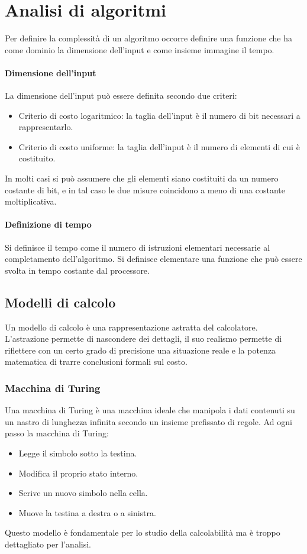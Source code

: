 \chapter{Analisi di algoritmi}
Per definire la complessit\`a di un algoritmo occorre definire una funzione che ha come dominio la dimensione dell'input e come insieme immagine il tempo.
\subsubsection{Dimensione dell'input}
La dimensione dell'input pu\`o essere definita secondo due criteri:
\begin{itemize}
\item Criterio di costo logaritmico: la taglia dell'input \`e il numero di bit necessari a rappresentarlo.
\item Criterio di costo uniforme: la taglia dell'input \`e il numero di elementi di cui \`e costituito.
\end{itemize}
In molti casi si pu\`o assumere che gli elementi siano costituiti da un numero costante di bit, e in tal caso le due misure coincidono a meno di una costante
moltiplicativa.
\subsubsection{Definizione di tempo}
Si definisce il tempo come il numero di istruzioni elementari necessarie al completamento dell'algoritmo. Si definisce elementare una funzione che pu\`o 
essere svolta in tempo costante dal processore. 
\section{Modelli di calcolo}
Un modello di calcolo \`e una rappresentazione astratta del calcolatore. L'astrazione permette di nascondere dei dettagli, il suo realismo permette di 
riflettere con un certo grado di precisione una situazione reale e la potenza matematica di trarre conclusioni formali sul costo. 
\subsection{Macchina di Turing}
Una macchina di Turing \`e una macchina ideale che manipola i dati contenuti su un nastro di lunghezza infinita secondo un insieme prefissato di regole. Ad
ogni passo la macchina di Turing:
\begin{itemize}
\item Legge il simbolo sotto la testina.
\item Modifica il proprio stato interno.
\item Scrive un nuovo simbolo nella cella.
\item Muove la testina a destra o a sinistra.
\end{itemize}
Questo modello \`e fondamentale per lo studio della calcolabilit\`a ma \`e troppo dettagliato per l'analisi.
